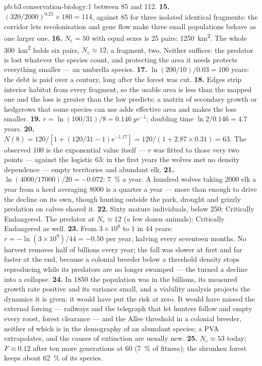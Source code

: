 \begin{solution}{pb:b3:conservation-biology:1}
between 85 and 112.
\textbf{15.} $(320/2000)^{0.25}\times 180 = 114$, against 85 for three
isolated identical fragments: the corridor lets recolonisation and
gene flow make three small populations behave as one larger one.
\textbf{16.} $N_{e} = 50$ with equal sexes is 25 pairs: \qty{1250}{km^2}.
The whole \qty{300}{km^2} holds six pairs, $N_{e} \approx 12$; a
fragment, two. Neither suffices: the predator is lost whatever the
species count, and protecting the area it needs protects everything
smaller --- an umbrella species.
\textbf{17.} $\ln(200/10)/0.03 = 100$ years: the debt is paid over a
century, long after the forest was cut.
\textbf{18.} Edges strip interior habitat from every fragment, so the
usable area is less than the mapped one and the loss is greater than
the law predicts; a matrix of secondary growth or hedgerows that some
species can use adds effective area and makes the loss smaller.
\textbf{19.} $r = \ln(100/31)/8 = \qty{0.146}{yr^{-1}}$; doubling time
$\ln 2/0.146 = 4.7$ years.
\textbf{20.} $N(8) = 120/[1 + (120/31 - 1)\mathrm{e}^{-1.17}] = 120/(1 +
2.87\times 0.31) = 63$. The observed 100 is the exponential value
itself --- $r$ was fitted to those very two points --- against the
logistic 63: in the first years the wolves met no density dependence
--- empty territories and abundant elk.
\textbf{21.} $\ln(4000/\num{17000})/20 = -0.072$: \qty{7}{\%} a year. A
hundred wolves taking \num{2000} elk a year from a herd averaging
\num{8000} is a quarter a year --- more than enough to drive the decline
on its own, though hunting outside the park, drought and grizzly
predation on calves shared it.
\textbf{22.} Sixty mature individuals, below 250: Critically Endangered.
The predator at $N_{e} \approx 12$ (a few dozen animals): Critically
Endangered as well.
\textbf{23.} From $3\times 10^{9}$ to $1$ in 44 years: $r = -\ln(3\times
10^{9})/44 = -0.50$ per year, halving every seventeen months. No
harvest removes half of billions every year; the fall was slower at
first and far faster at the end, because a colonial breeder below a
threshold density stops reproducing while its predators are no longer
swamped --- the  turned a decline into a collapse.
\textbf{24.} In 1850 the population was in the billions, its measured
growth rate positive and its variance small, and a viability analysis
projects the dynamics it is given: it would have put the risk at zero.
It would have missed the external forcing --- railways and the telegraph
that let hunters follow and empty every roost, forest clearance --- and
the Allee threshold in a colonial breeder, neither of which is in the
demography of an abundant species; a PVA extrapolates, and the causes
of extinction are usually new.
\textbf{25.} $N_{e} \approx 53$ today; $F \approx 0.12$ after ten more
generations at 60 (\qty{7}{\%} of fitness); the shrunken forest keeps
about \qty{62}{\%} of its species.
\end{solution}
